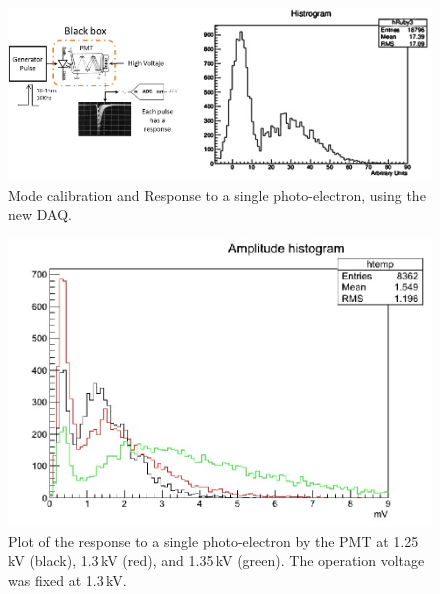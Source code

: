 \begin{figure}[t]
\centering
\includegraphics[scale=0.4]{images/mexico/sitelago-04.png}
\caption{Mode calibration and Response to a single photo-electron, using the new DAQ.}
\label{sitelago04}
\end{figure} 

\begin{figure}[t]
\centering
\includegraphics[scale=0.4]{images/mexico/sitelago-05.png}
\caption{Plot of the response to a single photo-electron by the PMT at 1.25\,kV (black), 1.3\,kV (red), and 1.35\,kV (green). The operation voltage was fixed at 1.3\,kV.}
\label{sitelago05}
\end{figure} 

%
